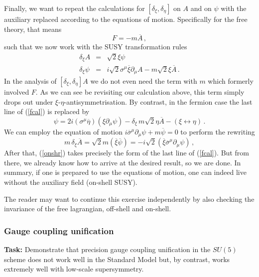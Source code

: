 \documentclass[12pt]{article}
\newcommand{\be}{\begin{equation}}
\newcommand{\ee}{\end{equation}}
\newcommand{\bea}{\begin{eqnarray}}
\newcommand{\eea}{\end{eqnarray}}
\newcommand{\ol}{\overline}
\numberwithin{equation}{section}
\begin{document}
Finally, we want to repeat the calculations for $[\delta_\xi,\delta_\eta]$ on $A$ and on $\psi$ with the auxiliary replaced according to the equations of motion. Specifically for the free theory, that means
\be
F=-m\ol{A}\,,
\ee
such that we now work with the SUSY transformation rules
\bea
\delta_\xi A&=&\sqrt{2}\xi\psi
\\
\delta_\xi \psi &=& i\sqrt{2}\sigma^\mu\ol{\xi}\partial_\mu A - m\sqrt{2}\xi \ol{A}\,.
\eea
In the analysis of $[\delta_\xi,\delta_\eta]A$ we do not even need the term with $m$ which formerly involved $F$. As we can see be revisiting our calculation above, this term simply drops out under $\xi$-$\eta$-antisymmetrisation. By contrast, in the fermion case the last line of (\ref{fcal}) is replaced by
\be
[\delta_\xi,\delta_\eta] \psi = 2i (\sigma^\mu\ol{\eta})(\xi \partial_\mu \psi) - \delta_\xi \,m\sqrt{2}\eta \ol{A} - (\xi\leftrightarrow \eta)\,. \label{onshr}
\ee
We can employ the equation of motion 
$i\ol{\sigma}^\mu\partial_\mu\psi + m\ol{\psi}=0$ to perform the rewriting
\be
m\,\delta_\xi \ol{A} = \sqrt{2}m(\ol{\xi}\ol{\psi}) = -i\sqrt{2}(\ol{\xi}\ol{\sigma}^\mu\partial_\mu\psi)\,,
\ee
After that, (\ref{onshr}) takes precisely the form of the last line of (\ref{fcal}). But from there, we already know how to arrive at the desired result, so we are done. In summary, if one is prepared to use the equations of motion, one can indeed live without the auxiliary field (on-shell SUSY). 

The reader may want to continue this exercise independently by also checking the invariance of the free lagrangian, off-shell and on-shell.







\subsubsection{Gauge coupling unification}\label{quni}

{\bf Task:} Demonstrate that precision gauge coupling unification in the $SU(5)$ scheme does not work well in the Standard Model but, by contrast, works extremely well with low-scale supersymmetry.
\end{document}
